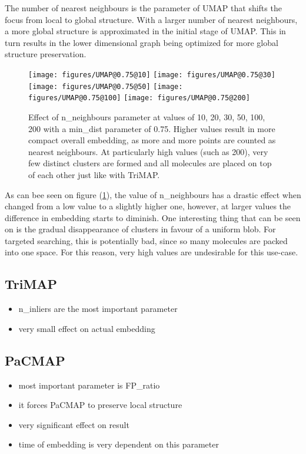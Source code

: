 The number of nearest neighbours is the parameter of UMAP that shifts the focus from local to global structure. With a larger number of nearest neighbours, a more global structure is approximated in the initial stage of UMAP. This in turn results in the lower dimensional graph being optimized for more global structure preservation. 

\begin{figure}[!h]
	\centering
	\texttt{[image: figures/UMAP@0.75@10]}
	\texttt{[image: figures/UMAP@0.75@30]}
	\texttt{[image: figures/UMAP@0.75@50]}
	\texttt{[image: figures/UMAP@0.75@100]}
	\texttt{[image: figures/UMAP@0.75@200]}
	\caption{Effect of n\_neighbours parameter at values of 10, 20, 30, 50, 100, 200 with a min\_dist parameter of 0.75. Higher values result in more compact overall embedding, as more and more points are counted as nearest neighbours. At particularly high values (such as 200), very few distinct clusters are formed and all molecules are placed on top of each other just like with TriMAP.}
	\label{fig:umap:n_neighbor}
\end{figure}

As can bee seen on figure (\ref{fig:umap:n_neighbor}), the value of n\_neighbours has a drastic effect when changed from a low value to a slightly higher one, however, at larger values the difference in embedding starts to diminish. One interesting thing that can be seen on is the gradual disappearance of clusters in favour of a uniform blob. For targeted searching, this is potentially bad, since so many molecules are packed into one space. For this reason, very high values are undesirable for this use-case.

\subsection{TriMAP}

\begin{itemize}
	\item n\_inliers are the most important parameter
	\item very small effect on actual embedding
\end{itemize}

\subsection{PaCMAP}

\begin{itemize}
	\item most important parameter is FP\_ratio
	\item it forces PaCMAP to preserve local structure
	\item very significant effect on result
	\item time of embedding is very dependent on this parameter
\end{itemize}

